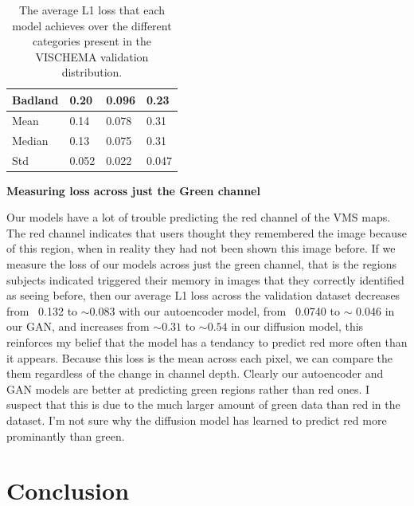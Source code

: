 \documentclass{UoYCSproject}
\begin{document}
\begin{table}[]
\begin{tabular}{|l|lll|}
        Badland                & \multicolumn{1}{l|}{0.20}        & \multicolumn{1}{l|}{0.096}& 0.23                                    \\ \hline
        \hline
        Mean                   & \multicolumn{1}{l|}{0.14}        & \multicolumn{1}{l|}{0.078}& 0.31                                    \\ \hline
        Median                 & \multicolumn{1}{l|}{0.13}        & \multicolumn{1}{l|}{0.075}& 0.31                                    \\ \hline
        Std                    & \multicolumn{1}{l|}{0.052}       & \multicolumn{1}{l|}{0.022}& 0.047                                   \\ \hline
    \end{tabular}
    \label{tab:categories}
    \caption{The average L1 loss that each model achieves over the different categories present in the VISCHEMA validation distribution.}
\end{table}

\textbf{Measuring loss across just the Green channel}

Our models have a lot of trouble predicting the red channel of the VMS maps. The red channel indicates that users thought they remembered the image because of this region, when in reality they had not been shown this image before. If we measure the loss of our models across just the green channel, that is the regions subjects indicated triggered their memory in images that they correctly identified as seeing before, 
then our average L1 loss across the validation dataset decreases from ~0.132 to \(\sim \)0.083 with our autoencoder model, 
from ~0.0740 to \(\sim \) 0.046 in our GAN, 
and increases from \(\sim 0.31 \) to \(\sim 0.54 \) in our diffusion model, this reinforces my belief that the model has a tendancy to predict red more often than it appears.
Because this loss is the mean across each pixel, we can compare the them regardless of the change in channel depth. Clearly our autoencoder and GAN models are better at predicting green regions rather than red ones. I suspect that this is due to the much larger amount of green data than red in the dataset. I'm not sure why the diffusion model has learned to predict red more prominantly than green.

\chapter{Conclusion}

\end{document}
